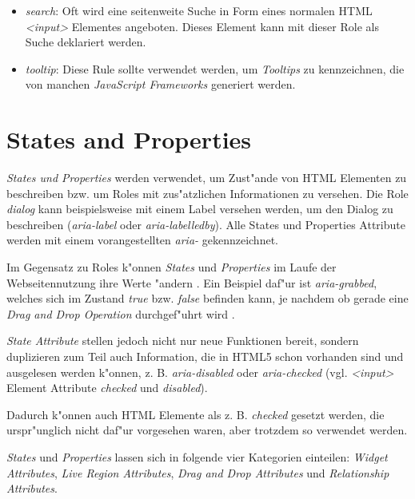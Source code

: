 \documentclass[a4paper,bibtotoc,oneside]{scrbook}
\begin{document}
\begin{itemize}
\item \emph{search}: Oft wird eine seitenweite Suche in Form eines normalen HTML \emph{<input>} Elementes angeboten. Dieses Element kann mit dieser Role als Suche deklariert werden. \cite[Abschnitt 5.4, search]{aria_roles}

\item \emph{tooltip}: Diese Rule sollte verwendet werden, um \emph{Tooltips} zu kennzeichnen, die von manchen \emph{JavaScript Frameworks} generiert werden. \cite[Abschnitt 5.4, tooltip]{aria_roles}
\end{itemize}



\section{States and Properties}
\emph{States und Properties} werden verwendet, um Zust"ande von HTML Elementen zu beschreiben bzw. um Roles mit zus"atzlichen Informationen zu versehen. Die Role \emph{dialog} kann beispielsweise mit einem Label versehen werden, um den Dialog zu beschreiben (\emph{aria-label} oder \emph{aria-labelledby})\cite[Abschnitt 5.4, dialog]{aria_roles}. Alle States und Properties Attribute werden mit einem vorangestellten \emph{aria-} gekennzeichnet. \cite[Abschnitt 6.1]{aria_states}

Im Gegensatz zu Roles k"onnen \emph{States} und \emph{Properties} im Laufe der Webseitennutzung ihre Werte "andern \cite[S. 29]{mod_software}. Ein Beispiel daf"ur ist \emph{aria-grabbed}, welches sich im Zustand \emph{true} bzw. \emph{false} befinden kann, je nachdem ob gerade eine \emph{Drag and Drop Operation} durchgef"uhrt wird \cite[Abschnitt 6.6, aria-grabbed]{aria_states}.

\emph{State Attribute} stellen jedoch nicht nur neue Funktionen bereit, sondern duplizieren zum Teil auch Information, die in HTML5 schon vorhanden sind und ausgelesen werden k"onnen, z. B. \emph{aria-disabled} oder \emph{aria-checked} \cite[States and Properties]{aria} (vgl. \emph{<input>} Element Attribute \emph{checked} und \emph{disabled}). \cite[Abschnitt Forms, Input Element]{html4} 

Dadurch k"onnen auch HTML Elemente als z. B. \emph{checked} gesetzt werden, die urspr"unglich nicht daf"ur vorgesehen waren, aber trotzdem so verwendet werden. 

\emph{States} und \emph{Properties} lassen sich in folgende vier Kategorien einteilen: \emph{Widget Attributes}, \emph{Live Region Attributes}, \emph{Drag and Drop Attributes} und \emph{Relationship Attributes}. \cite[Abschnitt 6.5]{aria_states}
\end{document}
